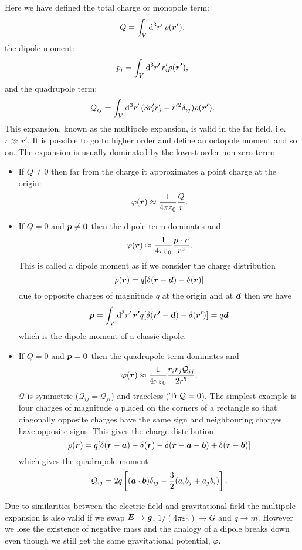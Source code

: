Here we have defined the total charge or monopole term:
\[Q = \int_V\dd[3]{r'}\rho(\bm{r'}),\]
the dipole moment:
\[p_i = \int_V \dd[3]{r'} r'_i\rho(\bm{r'}),\]
and the quadrupole term:
\[\mathcal{Q}_{ij} = \int_V \dd[3]{r'} (3r'_ir'_j - r'{^2}\delta_{ij})\rho(\bm{r'}).\]
This expansion, known as the multipole expansion, is valid in the far field, i.e. \(r \gg r'\).
It is possible to go to higher order and define an octopole moment and so on.
The expansion is usually dominated by the lowest order non-zero term:
\begin{itemize}
    \item If \(Q \ne 0\) then far from the charge it approximates a point charge at the origin:
    \[\varphi(\bm{r}) \approx \frac{1}{4\pi\varepsilon_0}\frac{Q}{r}.\]
    
    \item If \(Q = 0\) and \(\bm{p}\ne \bm{0}\) then the dipole term dominates and
    \[\varphi(\bm{r}) \approx \frac{1}{4\pi\varepsilon_0}\frac{\bm{p}\cdot\bm{r}}{r^3}.\]
    This is called a dipole moment as if we consider the charge distribution
    \[\rho(\bm{r}) = q[\delta(\bm{r} - \bm{d}) - \delta(\bm{r})]\]
    due to opposite charges of magnitude \(q\) at the origin and at \(\bm{d}\) then we have
    \[\bm{p} = \int_V \dd[3]{r'} \bm{r'}q[\delta(\bm{r'} - \bm{d}) - \delta(\bm{r'})] = q\bm{d}\]
    which is the dipole moment of a classic dipole.
    
    \item If \(Q = 0\) and \(\bm{p} = \bm{0}\) then the quadrupole term dominates and
    \[\varphi(\bm{r}) \approx \frac{1}{4\pi\varepsilon_0} \frac{r_ir_j\mathcal{Q}_{ij}}{2r^5}.\]
    \(\mathcal{Q}\) is symmetric (\(\mathcal{Q}_{ij} = \mathcal{Q}_{ji}\)) and traceless (\(\Tr\mathcal{Q} = 0\)).
    The simplest example is four charges of magnitude \(q\) placed on the corners of a rectangle so that diagonally opposite charges have the same sign and neighbouring charges have opposite signs.
    This gives the charge distribution
    \[\rho(\bm{r}) = q[\delta(\bm{r} - \bm{a}) - \delta(\bm{r}) - \delta(\bm{r} - \bm{a} - \bm{b}) + \delta(\bm{r} - \bm{b})]\]
    which gives the quadrupole moment
    \[\mathcal{Q}_{ij} = 2q\left[(\bm{a}\cdot\bm{b})\delta_{ij} - \frac{3}{2}(a_ib_j + a_jb_i)\right].\]
\end{itemize}
Due to similarities between the electric field and gravitational field the multipole expansion is also valid if we swap \(\bm{E} \to\bm{g}\), \(1/(4\pi\varepsilon_0) \to G\) and \(q\to m\).
However we lose the existence of negative mass and the analogy of a dipole breaks down even though we still get the same gravitational potential, \(\varphi\).
